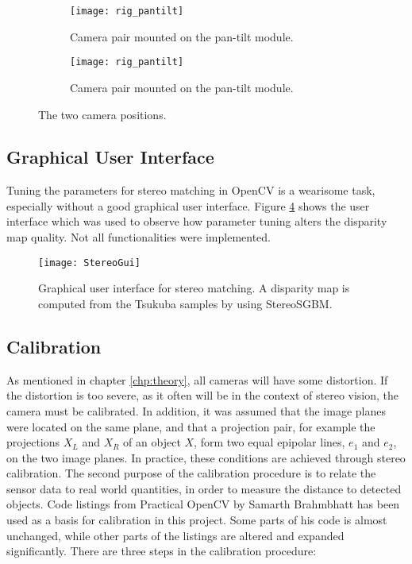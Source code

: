 \begin{figure}
	\centering
	\begin{subfigure}[b]{0.45\textwidth}
		\texttt{[image: rig\_pantilt]}
		\caption{Camera pair mounted on the pan-tilt module.}
		\label{fig:rig_pantilt}
	\end{subfigure}
	\begin{subfigure}[b]{0.45\textwidth}
		\texttt{[image: rig\_pantilt]}
		\caption{Camera pair mounted on the pan-tilt module.}
		\label{fig:rig_front}
	\end{subfigure}
	\caption{\label{fig:campos}The two camera positions.}
\end{figure}

\subsection{Graphical User Interface}

Tuning the parameters for stereo matching in OpenCV is a wearisome task, especially without a good graphical user interface. Figure \ref{fig:StereoGui} shows the user interface which was used to observe how parameter tuning alters the disparity map quality. Not all functionalities were implemented.

\begin{figure}
	\texttt{[image: StereoGui]}
	\caption{Graphical user interface for stereo matching. A disparity map is computed from the Tsukuba samples by using StereoSGBM. }
	\label{fig:StereoGui}
\end{figure}

\subsection{Calibration}

As mentioned in chapter \ref{chp:theory}, all cameras will have some distortion. If the distortion is too severe, as it often will be in the context of stereo vision, the camera must be calibrated. In addition, it was assumed that the image planes were located on the same plane, and that a projection pair, for example the projections $X_L$ and $X_R$ of an object $X$, form two equal epipolar lines, $e_1$ and $e_2$, on the two image planes. In practice, these conditions are achieved through stereo calibration. The second purpose of the calibration procedure is to relate the sensor data to real world quantities, in order to measure the distance to detected objects. Code listings from Practical OpenCV by Samarth Brahmbhatt \cite{practicalopencv} has been used as a basis for calibration in this project. Some parts of his code is almost unchanged, while other parts of the listings are altered and expanded significantly. There are three steps in the calibration procedure:

